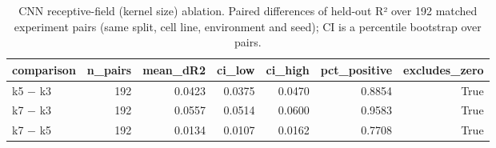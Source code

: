 \begin{table}[htbp]
\centering
\footnotesize
\caption{CNN receptive-field (kernel size) ablation. Paired differences of held-out R² over 192 matched experiment pairs (same split, cell line, environment and seed); CI is a percentile bootstrap over pairs.}
\label{tab:kernel}
\begin{tabular}{lrrrrrr}
\toprule
comparison & n\_pairs & mean\_dR2 & ci\_low & ci\_high & pct\_positive & excludes\_zero \\
\midrule
k5 $-$ k3 & 192 & 0.0423 & 0.0375 & 0.0470 & 0.8854 & True \\
k7 $-$ k3 & 192 & 0.0557 & 0.0514 & 0.0600 & 0.9583 & True \\
k7 $-$ k5 & 192 & 0.0134 & 0.0107 & 0.0162 & 0.7708 & True \\
\bottomrule
\end{tabular}
\end{table}
